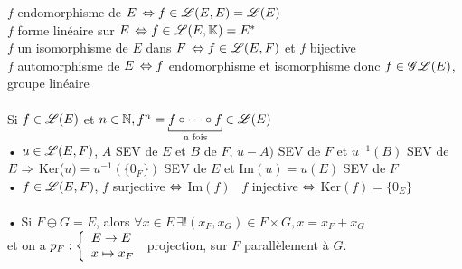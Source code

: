 \documentclass[12 pt]{exampleclass}
\begin{document}
\begin{flushleft}
\begin{doublespace}

	$f$ endomorphisme de $E \, \Leftrightarrow f\in \mathscr{L}(E,E) = \mathscr{L}(E)$\\
	$f$ forme linéaire sur $E \, \Leftrightarrow f\in \mathscr{L}(E,\mathbb{K}) = E^*$\\
	$f$ un isomorphisme de $E$ dans $F \, \Leftrightarrow f\in\mathscr{L}(E,F)$ et $f$ bijective\\
	$f$ automorphisme de $E \, \Leftrightarrow f$ endomorphisme et isomorphisme donc $f\in \mathscr{G}\mathscr{L}(E)$, groupe linéaire\\

	\text{ }\\
	Si $f\in\mathscr{L}(E)$ et $n\in\N , f^n = \underset{\text{n fois}}{\underbracket[0.5pt]{f\circ \cdots \circ f}} \in\sL(E)$\\
	• $u\in\mathscr{L}(E,F)$, $A$ SEV de $E$ et $B$ de $F$, $u-A)$ SEV de $F$ et $u^{-1}(B)$ SEV de $E \Rightarrow$ Ker($u) = u^{- 1} (\{0_F\})$ SEV de $E$ et Im$(u) = u(E)$ SEV de $F$\\
	• $f\in\mathscr{L}(E,F)$, $f$ surjective $\Leftrightarrow$ Im$(f)$ \ $f$ injective $\Leftrightarrow$ Ker$(f) = \{0_E\}$\\
	
	\text{ }\\
	• Si $F\oplus G = E$, alors $\forall x\in E \, \exists ! (x_F,x_G)\in F\times G, x=x_F+x_G$\\
	 et on a $p_F : \left\{\begin{array}{ll} E \rightarrow E \\ x\mapsto x_F \end{array} \right.$ projection, sur $F$ parallèlement à $G$.\\
	 

\end{doublespace}
\end{flushleft}
\end{document}
